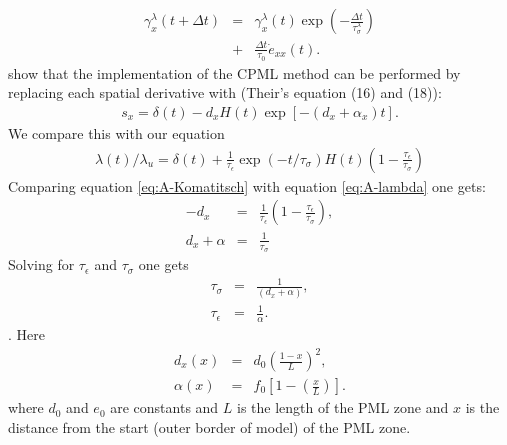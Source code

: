 \documentclass[11pt]{article}
\begin{document}
\begin{eqnarray*}
\gamma^{\lambda}_x(t+\Delta t) 
   & = & \gamma^{\lambda}_x (t)\exp(-\frac{\Delta t}{\tau^{\lambda}_{\sigma}}) \\
   & + & \frac{\Delta t}{\tau_{0}}\dot{e}_{xx}(t).
\end{eqnarray*}
\cite{Komatitsch2007} show that the implementation of the CPML method can
be performed by replacing each spatial derivative with
(Their's equation (16) and (18)):
\begin{eqnarray}
  s_x = \delta(t) - d_x H(t) \exp \left[-(d_x+\alpha_x)t\right].
                                          \label{eq:A-Komatitsch} 
\end{eqnarray}
We compare this with our equation
\begin{eqnarray}
  \lambda(t)/\lambda_u = \delta(t) + \frac{1}{\tau_{\epsilon}}
                         \exp(-t /\tau_{\sigma}) H(t)
                         \left(1-\frac{\tau_{\epsilon}}{\tau_{\sigma}}\right)
                                           \label{eq:A-lambda}
\end{eqnarray}
Comparing equation \eqref{eq:A-Komatitsch} with equation
\eqref{eq:A-lambda} one gets:
\begin{eqnarray}
-d_x         & = & \frac{1}{\tau_{\epsilon}}\left(1-\frac{\tau_{\epsilon}}
                                            {\tau_{\sigma}}\right), \\
d_x +\alpha & = & \frac{1}{\tau_{\sigma}}
\end{eqnarray}
Solving for $\tau_{\epsilon}$ and $\tau_{\sigma}$ one gets
\begin{eqnarray}
  \tau_{\sigma}   & = & \frac{1}{(d_x+\alpha)},\\
  \tau_{\epsilon} & = & \frac{1}{\alpha}.
\end{eqnarray}.
Here 
\begin{eqnarray}
 d_x (x) & = & d_0 \left(\frac{1-x}{L}\right)^2, \\
 \alpha(x) & = & f_0\left[1-\left(\frac{x}{L}\right)\right].
\end{eqnarray}
where $d_0$ and $e_0$ are constants and $L$ is the length of
the PML zone and $x$ is the distance from the start (outer border of model)
of the PML zone.


\end{document}
